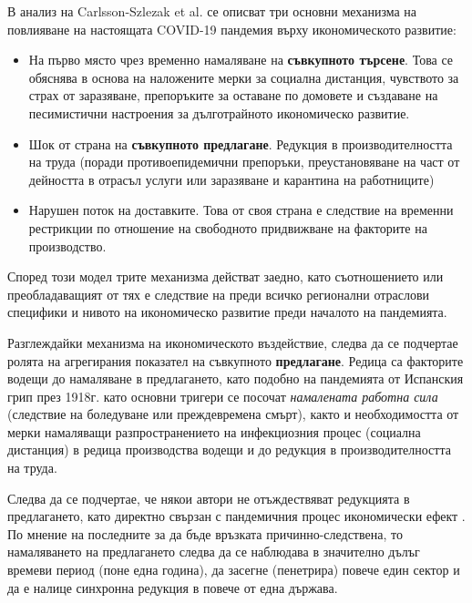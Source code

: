 \documentclass[a4paper,12pt]{article}
\begin{document}
В анализ на Carlsson-Szlezak et al. \cite{carlsson-szlezakUnderstandingEconomicShock2020a} се описват три основни механизма на повлияване на настоящата COVID-19 пандемия върху икономическото развитие:
\begin{itemize}
	\item  На първо място чрез временно намаляване на \textbf{съвкупното търсене}. Това се обяснява в основа на наложените мерки за социална дистанция, чувството за страх от заразяване\cite{Eichenbaum2022}, препоръките за оставане по домовете и създаване на песимистични настроения за дълготрайното икономическо развитие. 
	\item  Шок от страна на \textbf{съвкупното предлагане}. Редукция в производителността на труда (поради противоепидемични препоръки, преустановяване на част от дейността в отрасъл услуги или заразяване и карантина на работниците) \cite{doi:10.1080/1540496X.2020.1785426}
    \item  Нарушен поток на доставките. Това от своя страна е следствие на временни рестрикции по отношение на свободното придвижване на факторите на производство. 
\end{itemize}

Според този модел \cite{carlsson-szlezakUnderstandingEconomicShock2020a} трите механизма действат заедно, като съотношението или преобладаващият от тях е следствие на преди всичко регионални отраслови специфики и нивото на икономическо развитие преди началото на пандемията. 

Разглеждайки механизма на икономическото въздействие, следва да се подчертае ролята на агрегирания показател на съвкупното \textbf{предлагане}. Редица са факторите водещи до намаляване в предлагането, като подобно на пандемията от Испанския грип през 1918г. като основни тригери се посочат \textit{намалената работна сила} (следствие на боледуване или преждевремена смърт), както и необходимостта от мерки намаляващи разпространението на инфекциозния процес (социална дистанция) в редица производства \cite{Frist2006} водещи и до редукция в производителността на труда. 

Следва да се подчертае, че някои автори не отъждествяват редукцията в предлагането, като директно свързан с пандемичния процес икономически ефект \cite{guerrieri_macroeconomic_2020-1}. По мнение на последните за да бъде връзката причинно-следствена, то намаляването на предлагането следва да се наблюдава в значително дълъг времеви период (поне една година), да засегне (пенетрира) повече един сектор и да е налице синхронна редукция в повече от една държава. 
\end{document}
